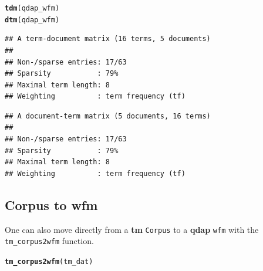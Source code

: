 \documentclass{article}\usepackage[]{graphicx}\usepackage[]{color}
\makeatletter
\newcommand{\hlstd}[1]{\textcolor[rgb]{0.345,0.345,0.345}{#1}}%
\newcommand{\hlkwd}[1]{\textcolor[rgb]{0.737,0.353,0.396}{\textbf{#1}}}%
\newenvironment{kframe}{%
 \def\at@end@of@kframe{}%
 \ifinner\ifhmode%
  \def\at@end@of@kframe{\end{minipage}}%
  \begin{minipage}{\columnwidth}%
 \fi\fi%
 \def\FrameCommand##1{\hskip\@totalleftmargin \hskip-\fboxsep
 \colorbox{shadecolor}{##1}\hskip-\fboxsep
     \hskip-\linewidth \hskip-\@totalleftmargin \hskip\columnwidth}%
 \MakeFramed {\advance\hsize-\width
   \@totalleftmargin\z@ \linewidth\hsize
   \@setminipage}}%
 {\par\unskip\endMakeFramed%
 \at@end@of@kframe}
\newenvironment{knitrout}{}{} %
\makeatother
\begin{document}
\begin{knitrout}
\color{fgcolor}\begin{kframe}
\begin{alltt}
\hlkwd{tdm}\hlstd{(qdap_wfm)}
\hlkwd{dtm}\hlstd{(qdap_wfm)}
\end{alltt}
\end{kframe}
\end{knitrout}


\begin{knitrout}
\color{fgcolor}\begin{kframe}
\begin{verbatim}
## A term-document matrix (16 terms, 5 documents)
## 
## Non-/sparse entries: 17/63
## Sparsity           : 79%
## Maximal term length: 8 
## Weighting          : term frequency (tf)
\end{verbatim}
\end{kframe}
\end{knitrout}


\begin{knitrout}
\color{fgcolor}\begin{kframe}
\begin{verbatim}
## A document-term matrix (5 documents, 16 terms)
## 
## Non-/sparse entries: 17/63
## Sparsity           : 79%
## Maximal term length: 8 
## Weighting          : term frequency (tf)
\end{verbatim}
\end{kframe}
\end{knitrout}


\subsection{Corpus to wfm}

One can also move directly from a \textbf{tm} \texttt{Corpus} to a \textbf{qdap} \texttt{wfm} with the \texttt{tm\_corpus2wfm} function.

\begin{knitrout}
\color{fgcolor}\begin{kframe}
\begin{alltt}
\hlkwd{tm_corpus2wfm}\hlstd{(tm_dat)}
\end{alltt}
\end{kframe}
\end{knitrout}
\end{document}
